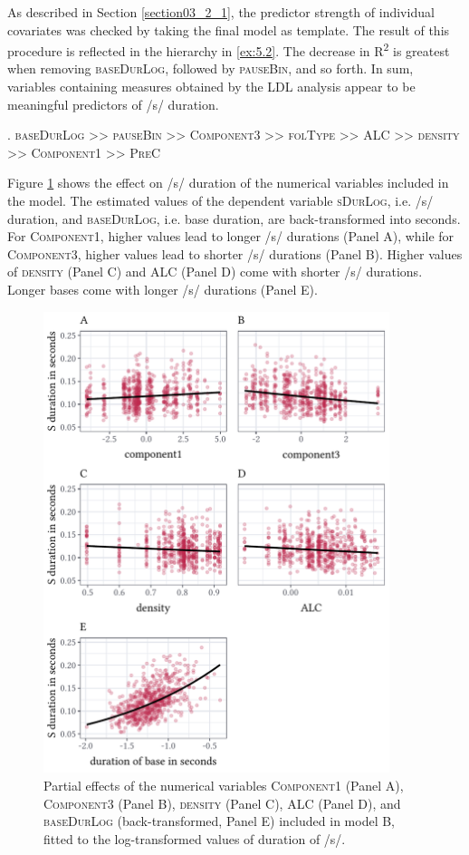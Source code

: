 As described in Section \ref{section03_2_1}, the predictor strength of individual covariates was checked by taking the final model as template. The result of this procedure is reflected in the hierarchy in \ref{ex:5.2}. The decrease in R\textsuperscript{2} is greatest when removing \textsc{baseDurLog}, followed by \textsc{pauseBin}, and so forth. In sum, variables containing measures obtained by the LDL analysis appear to be meaningful predictors of /s/ duration.

\ex.
\label{ex:5.2}
\textsc{baseDurLog >> pauseBin >> Component3 >> folType >> ALC >> density >> Component1 >> PreC}

Figure \ref{fig:5_1} shows the effect on /s/ duration of the numerical variables included in the model. The estimated values of the dependent variable \textsc{sDurLog}, i.e. /s/ duration, and \textsc{baseDurLog}, i.e. base duration, are back-transformed into seconds. For \textsc{Component1}, higher values lead to longer /s/ durations (Panel A), while for \textsc{Component3}, higher values lead to shorter /s/ durations (Panel B). Higher values of \textsc{density} (Panel C) and \textsc{ALC} (Panel D) come with shorter /s/ durations. Longer bases come with longer /s/ durations (Panel E).

\begin{figure}
    \centering
    \includegraphics[width=0.9\textwidth]{figures/fig5.1.pdf}
    \caption{Partial effects of the numerical variables \textsc{Component1} (Panel A), \textsc{Component3} (Panel B), \textsc{density} (Panel C), \textsc{ALC} (Panel D), and \textsc{baseDurLog} (back-transformed, Panel E) included in model B, fitted to the log-transformed values of duration of /s/.}
    \label{fig:5_1}
\end{figure}

